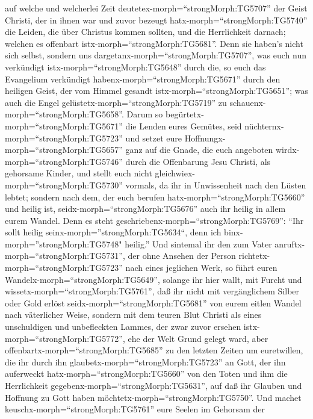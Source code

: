 auf welche und welcherlei Zeit deutetex-morph=``strongMorph:TG5707'' der
Geist Christi, der in ihnen war und zuvor bezeugt
hatx-morph=``strongMorph:TG5740'' die Leiden, die über Christus kommen
sollten, und die Herrlichkeit darnach;  welchen es
offenbart istx-morph=``strongMorph:TG5681''. Denn sie haben's nicht sich
selbst, sondern uns dargetanx-morph=``strongMorph:TG5707'', was euch nun
verkündigt istx-morph=``strongMorph:TG5648'' durch die, so euch das
Evangelium verkündigt habenx-morph=``strongMorph:TG5671'' durch den
heiligen Geist, der vom Himmel gesandt
istx-morph=``strongMorph:TG5651''; was auch die Engel
gelüstetx-morph=``strongMorph:TG5719'' zu
schauenx-morph=``strongMorph:TG5658''.  Darum so
begürtetx-morph=``strongMorph:TG5671'' die Lenden eures Gemütes, seid
nüchternx-morph=``strongMorph:TG5723'' und setzet eure
Hoffnungx-morph=``strongMorph:TG5657'' ganz auf die Gnade, die euch
angeboten wirdx-morph=``strongMorph:TG5746'' durch die Offenbarung Jesu
Christi,  als gehorsame Kinder, und stellt euch nicht
gleichwiex-morph=``strongMorph:TG5730'' vormals, da ihr in Unwissenheit
nach den Lüsten lebtet;  sondern nach dem, der euch berufen
hatx-morph=``strongMorph:TG5660'' und heilig ist,
seidx-morph=``strongMorph:TG5676'' auch ihr heilig in allem eurem
Wandel.  Denn es steht
geschriebenx-morph=``strongMorph:TG5769'': ``Ihr sollt heilig
seinx-morph=''strongMorph:TG5634``, denn ich
binx-morph=''strongMorph:TG5748" heilig.''  Und sintemal
ihr den zum Vater anruftx-morph=``strongMorph:TG5731'', der ohne Ansehen
der Person richtetx-morph=``strongMorph:TG5723'' nach eines jeglichen
Werk, so führt euren Wandelx-morph=``strongMorph:TG5649'', solange ihr
hier wallt, mit Furcht  und
wissetx-morph=``strongMorph:TG5761'', daß ihr nicht mit vergänglichem
Silber oder Gold erlöst seidx-morph=``strongMorph:TG5681'' von eurem
eitlen Wandel nach väterlicher Weise,  sondern mit dem
teuren Blut Christi als eines unschuldigen und unbefleckten Lammes,
 der zwar zuvor ersehen istx-morph=``strongMorph:TG5772'',
ehe der Welt Grund gelegt ward, aber
offenbartx-morph=``strongMorph:TG5685'' zu den letzten Zeiten um
euretwillen,  die ihr durch ihn
glaubetx-morph=``strongMorph:TG5723'' an Gott, der ihn auferweckt
hatx-morph=``strongMorph:TG5660'' von den Toten und ihm die Herrlichkeit
gegebenx-morph=``strongMorph:TG5631'', auf daß ihr Glauben und Hoffnung
zu Gott haben möchtetx-morph=``strongMorph:TG5750''.  Und
machet keuschx-morph=``strongMorph:TG5761'' eure Seelen im Gehorsam der
